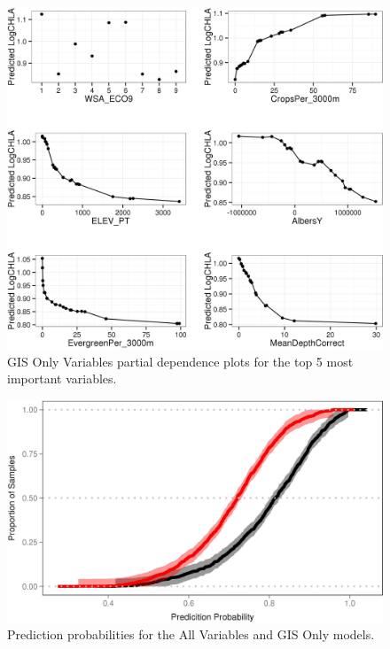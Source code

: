 \documentclass[11pt,]{article}
\begin{document}
\begin{figure}[htbp]
\centering
\includegraphics{manuscript_files/figure-latex/gis_partial_dependence-1.jpeg}
\caption{GIS Only Variables partial dependence plots for the top 5 most
important variables. \label{fig:gis_partial_dependence}}
\end{figure}

\newpage

\begin{figure}[htbp]
\centering
\includegraphics{manuscript_files/figure-latex/prob_cdf-1.jpeg}
\caption{Prediction probabilities for the All Variables and GIS Only
models. \label{fig:prob_cdf}}
\end{figure}
\end{document}
